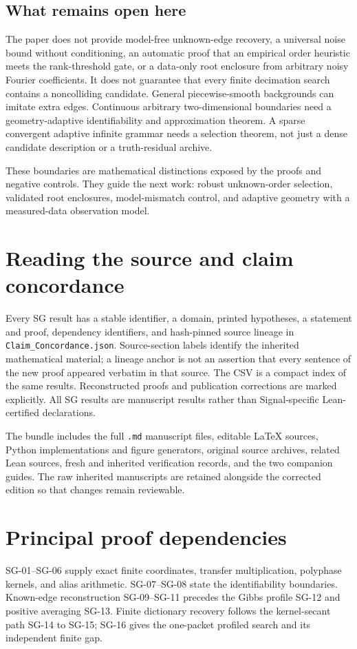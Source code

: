 \documentclass[11pt]{article}
\theoremstyle{definition}\newtheorem{definition}[theorem]{Definition}
\theoremstyle{remark}\newtheorem{remark}[theorem]{Remark}
\begin{document}
\subsection{What remains open here}
The paper does not provide model-free unknown-edge recovery, a universal
noise bound without conditioning, an automatic proof that an empirical order
heuristic meets the rank-threshold gate, or a data-only root enclosure from
arbitrary noisy Fourier coefficients. It does not guarantee that every finite
decimation search contains a noncolliding candidate. General piecewise-smooth
backgrounds can imitate extra edges. Continuous arbitrary two-dimensional
boundaries need a geometry-adaptive identifiability and approximation theorem.
A sparse convergent adaptive infinite grammar needs a selection theorem,
not just a dense candidate description or a truth-residual archive.

These boundaries are mathematical distinctions exposed by the proofs and
negative controls. They guide the next work: robust unknown-order selection,
validated root enclosures, model-mismatch control, and adaptive geometry with
a measured-data observation model.



\appendix
\section{Reading the source and claim concordance}
Every SG result has a stable identifier, a domain, printed hypotheses,
a statement and proof, dependency identifiers, and hash-pinned source
lineage in \texttt{Claim\_Concordance.json}. Source-section labels identify
the inherited mathematical material; a lineage anchor is not an assertion
that every sentence of the new proof appeared verbatim in that source.
The CSV is a compact index of the same results. Reconstructed proofs and
publication corrections are marked explicitly. All SG results are
manuscript results rather than Signal-specific Lean-certified declarations.

The bundle includes the full \texttt{.md} manuscript files, editable
\LaTeX{} sources, Python implementations and figure generators, original
source archives, related Lean sources, fresh and inherited verification
records, and the two companion guides. The raw inherited manuscripts are
retained alongside the corrected edition so that changes remain reviewable.

\section{Principal proof dependencies}
SG-01--SG-06 supply exact finite coordinates, transfer multiplication,
polyphase kernels, and alias arithmetic. SG-07--SG-08 state the
identifiability boundaries. Known-edge reconstruction SG-09--SG-11 precedes
the Gibbs profile SG-12 and positive averaging SG-13. Finite dictionary
recovery follows the kernel-secant path SG-14 to SG-15; SG-16 gives the
one-packet profiled search and its independent finite gap.
\end{document}
